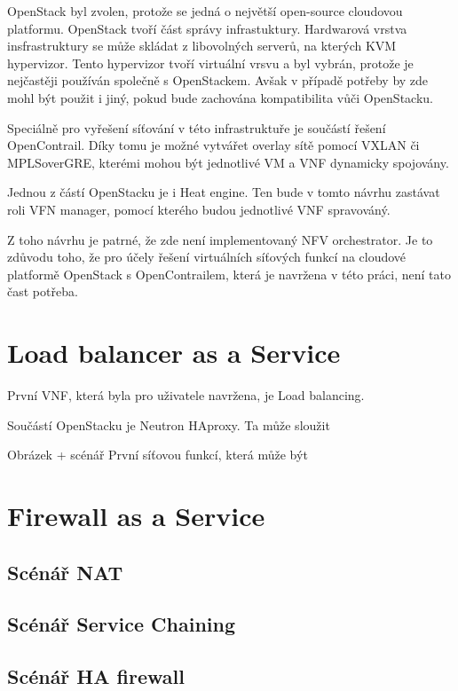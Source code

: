 OpenStack byl zvolen, protože se jedná o největší open-source cloudovou platformu. OpenStack tvoří část správy infrastuktury. Hardwarová vrstva insfrastruktury se může skládat z libovolných serverů, na kterých KVM hypervizor. Tento hypervizor tvoří virtuální vrsvu a byl vybrán, protože je nejčastěji používán společně s OpenStackem. Avšak v případě potřeby by zde mohl být použit i jiný, pokud bude zachována kompatibilita vůči OpenStacku.

Speciálně pro vyřešení síťování v této infrastruktuře je součástí řešení OpenContrail. Díky tomu je možné vytvářet overlay sítě pomocí VXLAN či MPLSoverGRE, kterémi mohou být jednotlivé VM a VNF dynamicky spojovány.

Jednou z částí OpenStacku je i Heat engine. Ten bude v tomto návrhu zastávat roli VFN manager, pomocí kterého budou jednotlivé VNF spravováný.

Z toho návrhu je patrné, že zde není implementovaný NFV orchestrator. Je to zdůvodu toho, že pro účely řešení virtuálních síťových funkcí na cloudové platformě OpenStack s OpenContrailem, která je navržena v této práci, není tato čast potřeba. 


\section{Load balancer as a Service}

První VNF, která byla pro uživatele navržena, je Load balancing. 

Součástí OpenStacku je Neutron HAproxy. Ta může sloužit 

Obrázek + scénář
První síťovou funkcí, která může být  

\section{Firewall as a Service}

\subsection{Scénář NAT}

\subsection{Scénář Service Chaining}

\subsection{Scénář HA firewall}

